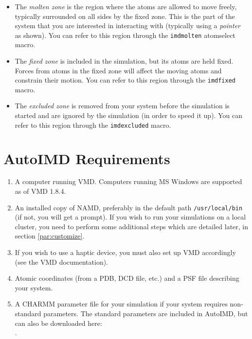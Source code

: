 \vspace{-1\baselineskip}
\begin{itemize}
\item The {\em molten zone} is the region where the atoms are allowed
to move freely, typically surrounded on all sides by the fixed zone.
This is the part of the system that you are interested in interacting
with (typically using a {\em pointer} as shown). You can refer to this
region through the {\tt imdmolten} atomselect macro.
\item The {\em fixed zone} is included in the simulation, but its
atoms are held fixed. Forces from atoms in the fixed zone will
affect the moving atoms and constrain their motion. You can refer to this
region through the {\tt imdfixed} macro.
\item The {\em excluded zone} is removed from your system before
the simulation is started and are ignored by the simulation (in order to speed it up).
You can refer to this region through the {\tt imdexcluded} macro.
\end{itemize}


\section{AutoIMD Requirements}

\vspace{-1\baselineskip}
\begin{enumerate}
\item A computer running VMD. Computers running MS Windows are supported as of VMD 1.8.4.
\item An installed copy of NAMD, preferably in the default path {\tt /usr/local/bin} (if not, you will get a prompt). 
If you wish to run your simulations on a local cluster, you 
need to perform some additional steps which are detailed later, in section
 \ref{par:customize}.
\item If you wish to use a haptic device, you must also set up VMD
 accordingly (see the VMD documentation).
\item Atomic coordinates (from a PDB, DCD file, etc.) and a PSF file
 describing your system.
\item A CHARMM parameter file for your simulation if your system requires non-standard parameters. The standard parameters are included in AutoIMD, but can also be downloaded here: \\ .
\end{enumerate}


